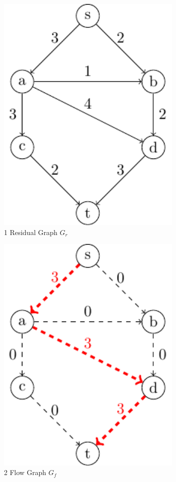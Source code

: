 \begin{minipage}{0.2\textwidth}
\begin{figure}[H]
  \centering
  \includegraphics[width=0.8\textwidth]{Figure/maxflow_d2_3.pdf}
  \caption*{1 Residual Graph \(G_r\)}
\end{figure}
\end{minipage}
\begin{minipage}{0.2\textwidth}
\begin{figure}[H]
  \centering
  \includegraphics[width=0.8\textwidth]{Figure/maxflow_d2_4.pdf}
  \caption*{2 Flow Graph \(G_f\)}
\end{figure}
\end{minipage}

